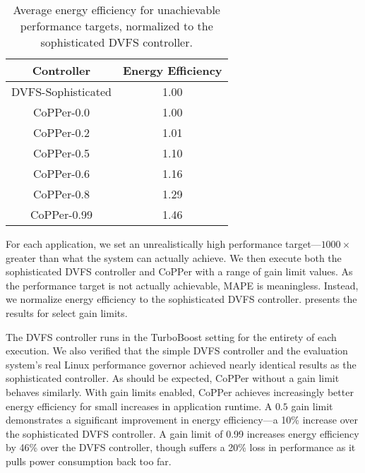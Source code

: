 \begin{table}[t]
\small
\centering
\caption{Average energy efficiency for unachievable performance targets, normalized to the sophisticated DVFS controller.}
\begin{tabular}{cc}
  \textbf{Controller} & \textbf{Energy Efficiency} \\
  \hline
  \hline
  DVFS-Sophisticated &  1.00 \\
  CoPPer-0.0         &  1.00  \\
  CoPPer-0.2         &  1.01 \\
  CoPPer-0.5         &  1.10  \\
  CoPPer-0.6         &  1.16  \\
  CoPPer-0.8         &  1.29  \\
  CoPPer-0.99        &  1.46  \\
  \hline
  \hline
\end{tabular}
\label{tbl:copper-impossible}
\end{table}

For each application, we set an unrealistically high performance target---$1000\times$ greater than what the system can actually achieve.
We then execute both the sophisticated DVFS controller and CoPPer with a range of gain limit values.
As the performance target is not actually achievable, MAPE is meaningless.
Instead, we normalize energy efficiency to the sophisticated DVFS controller.
 presents the results for select gain limits.

The DVFS controller runs in the TurboBoost setting for the entirety of each execution.
We also verified that the simple DVFS controller and the evaluation system's real Linux performance governor achieved nearly identical results as the sophisticated controller.
As should be expected, CoPPer without a gain limit behaves similarly.
With gain limits enabled, CoPPer achieves increasingly better energy efficiency for small increases in application runtime.
A $0.5$ gain limit demonstrates a significant improvement in energy efficiency---a 10\% increase over the sophisticated DVFS controller.
A gain limit of 0.99 increases energy efficiency by 46\% over the DVFS controller, though suffers a 20\% loss in performance as it pulls power consumption back too far.

